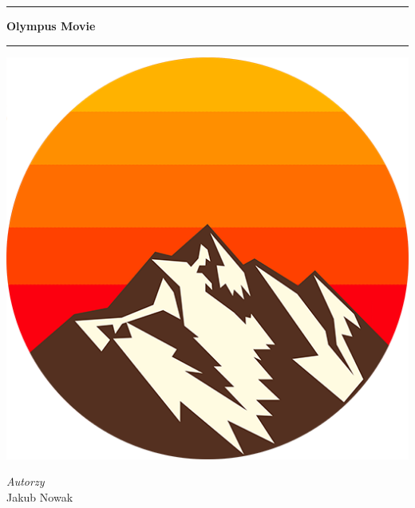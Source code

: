 \documentclass[12pt]{article}
\begin{document}
\begin{titlepage} %
	
	\center %
	
	
	\rule[1.0cm]{\textwidth}{1.0mm}
	
	{\huge\bfseries Olympus Movie}\\[0.5cm]
	
	\rule[1.5cm]{\textwidth}{1.0mm}
	
	
	\includegraphics[scale=0.5]{logo.png}\\[1cm]
	
	
	
	\begin{minipage}{0.4\textwidth}
		\begin{flushright}
			\large
			\textit{Autorzy}\\
			Jakub Nowak
			

\end{flushright}
\end{minipage}
\end{titlepage}
\end{document}

